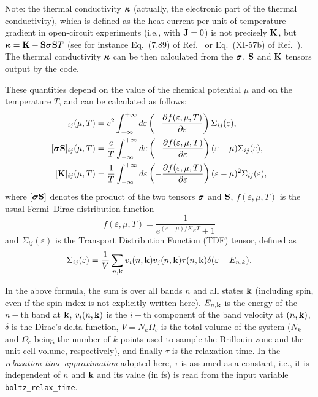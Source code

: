 Note: the thermal conductivity $\bm{\mathrm{\kappa}}$ (actually, the electronic part of the thermal conductivity), which is defined as the heat current per unit of temperature gradient in open-circuit experiments (i.e., with $\bm{\mathrm{J}}=0$) is not precisely $\bm{\mathrm{K}}$, but  $\bm{\mathrm{\kappa}} = \bm{\mathrm{K}}-\bm{\mathrm{S}} \bm{\mathrm{\sigma}} \bm{\mathrm{S}} T$ (see for instance Eq.~(7.89) of Ref.~\cite{ziman-book72} or Eq.~(XI-57b) of Ref.~\cite{grosso-book00}).
The thermal conductivity $\bm{\mathrm{\kappa}}$ can be then calculated from the $\bm{\mathrm{\sigma}}$, $\bm{\mathrm{S}}$ and $\bm{\mathrm{K}}$ tensors output by the code.

These quantities depend on the value of the chemical potential $\mu$ and on the temperature $T$, and can be calculated as follows:
\begin{align}
  [\bvec \sigma]_{ij}(\mu,T)&=e^2 \int_{-\infty}^{+\infty} d\varepsilon \left(-\frac {\partial f(\varepsilon,\mu,T)}{\partial \varepsilon}\right)\Sigma_{ij}(\varepsilon), \\
  [\bvec \sigma \bvec S]_{ij}(\mu,T)&=\frac e T \int_{-\infty}^{+\infty} d\varepsilon \left(-\frac {\partial f(\varepsilon,\mu,T)}{\partial \varepsilon}\right)(\varepsilon-\mu)\Sigma_{ij}(\varepsilon), \label{eq:boltz-sigmas}\\
  [\bvec K]_{ij}(\mu,T)&=\frac 1 T \int_{-\infty}^{+\infty} d\varepsilon \left(-\frac {\partial f(\varepsilon,\mu,T)}{\partial \varepsilon}\right)(\varepsilon-\mu)^2 \Sigma_{ij}(\varepsilon),\label{eq:boltz-thermcond}
\end{align}
where $[\bm{\mathrm{\sigma}} \bm{\mathrm{S}}]$ denotes the product of the two tensors $\bm{\mathrm{\sigma}}$ and $\bm{\mathrm{S}}$, $f(\varepsilon,\mu,T)$ is the usual Fermi--Dirac distribution function
\begin{equation*}
  f(\varepsilon,\mu,T) = \frac{1}{e^{(\varepsilon-\mu)/K_B T}+1}
\end{equation*}
and $\Sigma_{ij}(\varepsilon)$ is the Transport Distribution Function (TDF) tensor, defined as
\begin{equation*}
  \Sigma_{ij}(\varepsilon) = \frac 1 V \sum_{n,\bm{\mathrm{k}}} v_i(n,\bm{\mathrm{k}}) v_j(n,\bm{\mathrm{k}}) \tau(n,\bm{\mathrm{k}}) \delta(\varepsilon - E_{n,k}).
\end{equation*}

In the above formula, the sum is over all bands $n$ and all states $\bm{\mathrm{k}}$ (including spin, even if the spin index is not explicitly written here). $E_{n,\bm{\mathrm{k}}}$ is the energy of the $n-$th band at $\bm{\mathrm{k}}$, $v_i(n,\bm{\mathrm{k}})$ is the $i-$th component of the band velocity at $(n,\bm{\mathrm{k}})$, $\delta$ is the Dirac's delta function, $V = N_k \Omega_c$ is the total volume of the system ($N_k$ and $\Omega_c$ being the number of $k$-points used to sample the Brillouin zone and the unit cell volume, respectively), and finally $\tau$ is the relaxation time. In the \emph{relaxation-time approximation} adopted here, $\tau$ is assumed as a constant, i.e., it is independent of $n$ and $\bm{\mathrm{k}}$ and its value (in fs) is read from the input variable \verb#boltz_relax_time#.

